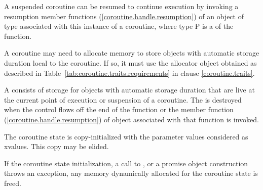 \pnum
A suspended coroutine can be resumed
to continue execution by invoking
a resumption member functions (\ref{coroutine.handle.resumption}) of an object of  type
associated with this instance of a coroutine, where type P
is a  of the function. 

\pnum
A coroutine may need to allocate
memory to store objects with automatic storage duration
local to the coroutine. If so, it must
use the allocator object obtained as described in 
Table~\ref{tab:coroutine.traits.requirements} in clause \ref{coroutine.traits}.

\pnum
A  consists of 
storage for objects with automatic storage duration
that are live at the current point of execution or suspension of 
a coroutine.
The  is destroyed when
the control flows off the end of the function or
the  member function (\ref{coroutine.handle.resumption}) of  object associated with that function is invoked.



%
%

\pnum
The coroutine state is copy-initialized with the parameter values considered as xvalues. 
This copy may be elided.




\pnum
If the coroutine state initialization, a call to , or a promise object construction throws
an exception, 
any memory dynamically allocated 
for the coroutine state is freed.

